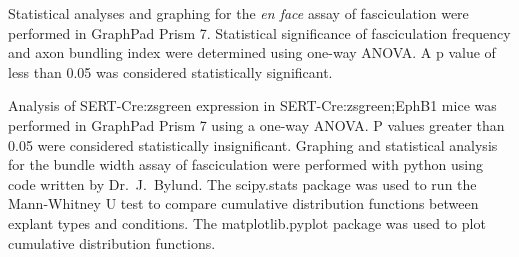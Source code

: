 Statistical analyses and graphing for the \emph{en face} assay of fasciculation were performed in GraphPad Prism 7.
Statistical significance of fasciculation frequency and axon bundling index were determined using one-way ANOVA.
A p value of less than 0.05 was considered statistically significant.

Analysis of SERT-Cre:zsgreen expression in SERT-Cre:zsgreen;EphB1 mice was performed in GraphPad Prism 7 using a one-way ANOVA.
P values greater than 0.05 were considered statistically insignificant.
Graphing and statistical analysis for the bundle width assay of fasciculation were performed with python using code written by Dr.~J.~Bylund.
The scipy.stats package was used to run the Mann-Whitney U test to compare cumulative distribution functions between explant types and conditions.
The matplotlib.pyplot package was used to plot cumulative distribution functions.
